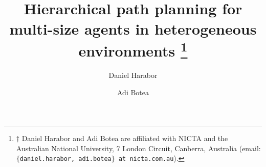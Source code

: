 \documentclass[conference]{IEEEtran}
\begin{document}
\long{}
\title{\ \\ \LARGE\bf Hierarchical path planning for multi-size agents in heterogeneous environments \thanks{$\dagger$ Daniel Harabor and Adi Botea are affiliated with NICTA and the Australian National University, 7 London Circuit, Canberra, Australia (email: {\tt$\lbrace$daniel.harabor, adi.botea$\rbrace$ at nicta.com.au}).}}
\author{Daniel Harabor\symbolfootnote[2]{} \and Adi Botea\symbolfootnote[2]{}}

\maketitle









 









%
%
%
%
\end{document}
